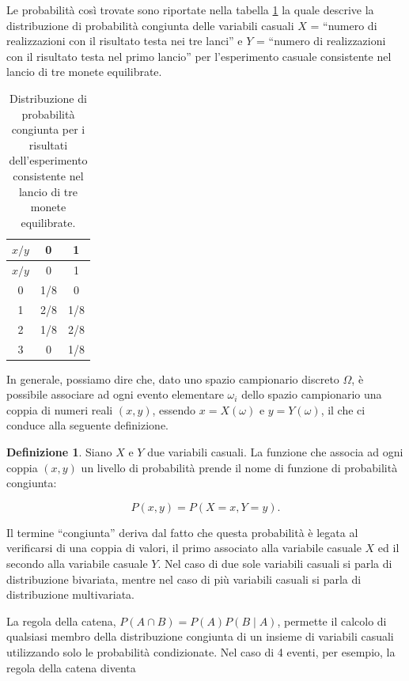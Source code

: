 \documentclass[
  11pt,
]{krantz}
\theoremstyle{definition}
\newtheorem{definition}{Definizione}[chapter]
\theoremstyle{definition}
\theoremstyle{definition}
\theoremstyle{definition}
\theoremstyle{remark}
\begin{document}
Le probabilità così trovate sono riportate nella tabella \ref{tab:ditr-cong-biv-1} la quale descrive la distribuzione di probabilità congiunta delle variabili casuali \(X\) = ``numero di realizzazioni con il risultato testa nei tre lanci'' e \(Y\) = ``numero di realizzazioni con il risultato testa nel primo lancio'' per l'esperimento casuale consistente nel lancio di tre monete equilibrate.

\begin{longtable}[]{@{}ccc@{}}
\caption{\label{tab:ditr-cong-biv-1} Distribuzione di probabilità congiunta per i risultati dell'esperimento consistente nel lancio di tre monete equilibrate.}\tabularnewline
\toprule
\(x / y\) & 0 & 1 \\
\midrule
\endfirsthead
\toprule
\(x / y\) & 0 & 1 \\
\midrule
\endhead
0 & 1/8 & 0 \\
1 & 2/8 & 1/8 \\
2 & 1/8 & 2/8 \\
3 & 0 & 1/8 \\
\bottomrule
\end{longtable}

In generale, possiamo dire che, dato uno spazio campionario discreto \(\Omega\), è possibile associare ad ogni evento elementare \(\omega_i\) dello spazio campionario una coppia di numeri reali \((x, y)\), essendo \(x = X(\omega)\) e \(y = Y(\omega)\), il che ci conduce alla seguente definizione.

\begin{definition}
Siano \(X\) e \(Y\) due variabili casuali. La funzione che associa ad ogni coppia \((x, y)\) un livello di probabilità prende il nome di funzione di probabilità congiunta:

\[
P(x, y) = P(X = x, Y = y).
\]
\end{definition}

Il termine ``congiunta'' deriva dal fatto che questa probabilità è legata al verificarsi di una coppia di valori, il primo associato alla variabile casuale \(X\) ed il secondo alla variabile casuale \(Y\). Nel caso di due sole variabili casuali si parla di distribuzione bivariata, mentre nel caso di più variabili casuali si parla di distribuzione multivariata.

La regola della catena, \(P(A \cap B) = P(A)P(B \mid A)\), permette il calcolo di qualsiasi membro della distribuzione congiunta di un insieme di variabili casuali utilizzando solo le probabilità condizionate. Nel caso di 4 eventi, per esempio, la regola della catena diventa
\end{document}
